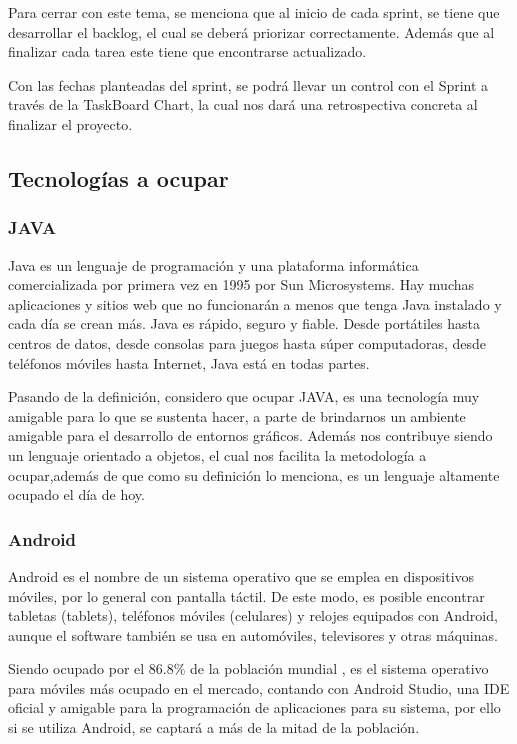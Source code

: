 \documentclass[10pt]{article}
\begin{document}
Para cerrar con este tema, se menciona que al inicio de cada sprint, se tiene que desarrollar el backlog, el cual se deberá priorizar correctamente. Además que al finalizar cada tarea este tiene que encontrarse actualizado.

Con las fechas planteadas del sprint, se podrá llevar un control con el Sprint a través de la TaskBoard Chart, la cual nos dará una retrospectiva concreta al finalizar el proyecto.

\newpage

\subsection{Tecnologías a ocupar}
\subsubsection{JAVA}
Java es un lenguaje de programación y una plataforma informática comercializada por primera vez en 1995 por Sun Microsystems. Hay muchas aplicaciones y sitios web que no funcionarán a menos que tenga Java instalado y cada día se crean más. Java es rápido, seguro y fiable. Desde portátiles hasta centros de datos, desde consolas para juegos hasta súper computadoras, desde teléfonos móviles hasta Internet, Java está en todas partes\cite{IEEEreferencias:Ref40}.

Pasando de la definición, considero que ocupar JAVA, es una tecnología muy amigable para lo que se sustenta hacer, a parte de brindarnos un ambiente amigable para el desarrollo de entornos gráficos. Además nos contribuye siendo un lenguaje orientado a objetos, el cual nos facilita la metodología a ocupar,además de que como su definición lo menciona, es un lenguaje altamente ocupado el día de hoy.

\subsubsection{Android}
Android es el nombre de un sistema operativo que se emplea en dispositivos móviles, por lo general con pantalla táctil. De este modo, es posible encontrar tabletas (tablets), teléfonos móviles (celulares) y relojes equipados con Android, aunque el software también se usa en automóviles, televisores y otras máquinas\cite{IEEEreferencias:Ref41}.

Siendo ocupado por el 86.8\% de la población mundial \cite{IEEEreferencias:Ref42}, es el sistema operativo para móviles más ocupado en el mercado, contando con Android Studio, una IDE oficial y amigable para la programación de aplicaciones para su sistema, por ello si se utiliza Android, se captará a más de la mitad de la población.
\end{document}
